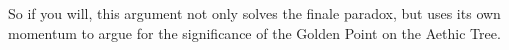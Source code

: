 \begin{concept}
    So if you will, this argument not only solves the finale paradox, but uses its own momentum to argue for the significance of the Golden Point on the Aethic Tree.
\end{concept}